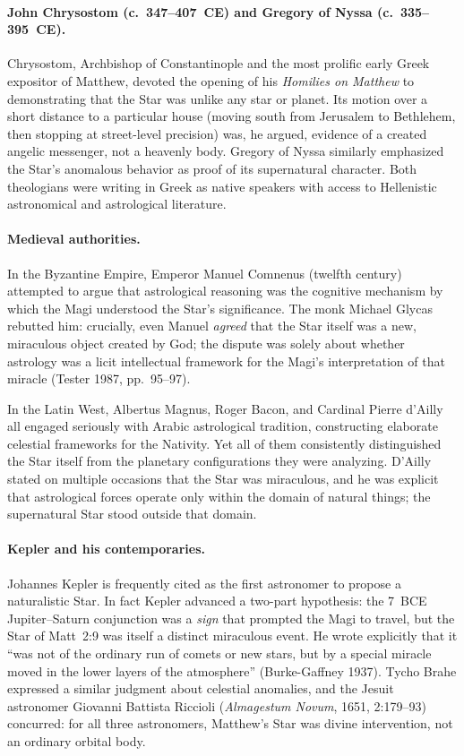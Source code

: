 \documentclass[11pt,a4paper]{article}
\begin{document}
\paragraph{John Chrysostom (c.~347--407~CE) and Gregory of Nyssa (c.~335--395~CE).}
Chrysostom, Archbishop of Constantinople and the most prolific early Greek expositor of Matthew,
devoted the opening of his \textit{Homilies on Matthew} to demonstrating that the Star was unlike
any star or planet. Its motion over a short distance to a particular house (moving south from
Jerusalem to Bethlehem, then stopping at street-level precision) was, he argued, evidence of
a created angelic messenger, not a heavenly body. Gregory of Nyssa similarly emphasized the Star's
anomalous behavior as proof of its supernatural character. Both theologians were writing in
Greek as native speakers with access to Hellenistic astronomical and astrological literature.

\paragraph{Medieval authorities.}
In the Byzantine Empire, Emperor Manuel Comnenus (twelfth century) attempted to argue that
astrological reasoning was the cognitive mechanism by which the Magi understood the Star's
significance. The monk Michael Glycas rebutted him: crucially, even Manuel \emph{agreed} that
the Star itself was a new, miraculous object created by God; the dispute was solely about whether
astrology was a licit intellectual framework for the Magi's interpretation of that miracle
(Tester 1987, pp.~95--97)\cite{tester1987}.

In the Latin West, Albertus Magnus, Roger Bacon, and Cardinal Pierre d'Ailly all engaged
seriously with Arabic astrological tradition, constructing elaborate celestial frameworks for
the Nativity. Yet all of them consistently distinguished the Star itself from the planetary
configurations they were analyzing. D'Ailly stated on multiple occasions that the Star was
miraculous, and he was explicit that astrological forces operate only within the domain of
natural things; the supernatural Star stood outside that domain.

\paragraph{Kepler and his contemporaries.}
Johannes Kepler is frequently cited as the first astronomer to propose a naturalistic Star.
In fact Kepler advanced a two-part hypothesis: the 7~BCE Jupiter--Saturn conjunction was a
\emph{sign} that prompted the Magi to travel, but the Star of Matt~2:9 was itself a distinct
miraculous event. He wrote explicitly that it ``was not of the ordinary run of comets or new
stars, but by a special miracle moved in the lower layers of the atmosphere''
(Burke-Gaffney 1937)\cite{kepler1606}. Tycho Brahe expressed a similar judgment about
celestial anomalies, and the Jesuit astronomer Giovanni Battista Riccioli
(\textit{Almagestum Novum}, 1651, 2:179--93) concurred: for all three astronomers,
Matthew's Star was divine intervention, not an ordinary orbital body.
\end{document}
